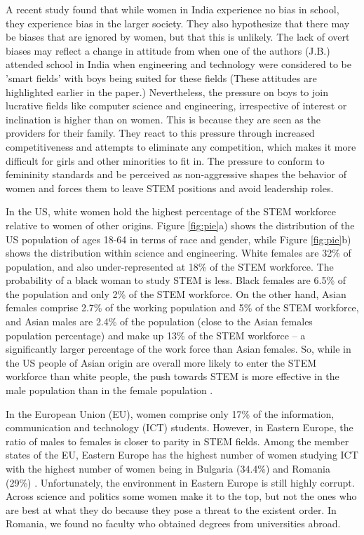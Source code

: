 \documentclass[utf8]{frontiersSCNS} %
\begin{document}
A recent study \citep{escueta2013women} found that while women in India experience no bias in school, they experience bias in the larger society. They also hypothesize that there may be biases that are ignored by women, but that this is unlikely. The lack of overt biases may reflect a change in attitude from when one of the authors (J.B.) attended school in India when engineering and technology were considered to be 'smart fields' with boys being suited for these fields (These attitudes are highlighted earlier in the paper.) Nevertheless, the pressure on boys to join lucrative fields like computer science and engineering, irrespective of interest or inclination is higher than on women. This is because they are seen as the providers for their family. They react to this pressure through increased competitiveness and attempts to eliminate any competition, which makes it more difficult for girls and other minorities to fit in. The pressure to conform to femininity standards and be perceived as non-aggressive shapes the behavior of women and forces them to leave STEM positions and avoid leadership roles.
 
 In the US, white women hold the highest percentage of the STEM workforce relative to women of other origins. Figure \ref{fig:pie}a) shows the distribution of the US population of ages 18-64 in terms of race and gender, while Figure \ref{fig:pie}b) shows the distribution within science and engineering.  White females are 32\% of population, and also under-represented at 18\% of the STEM workforce. The probability of a black woman to study STEM is less. Black females are 6.5\% of the population and only 2\% of the STEM workforce. On the other hand, Asian females comprise 2.7\% of the working population and 5\% of the STEM workforce, and Asian males are 2.4\% of the population (close to the Asian females population percentage) and make up 13\% of the STEM workforce -- a significantly larger percentage of the work force than Asian females. So, while in the US people of Asian origin are overall more likely to enter the STEM workforce than white people, the push towards STEM is more effective in the male population than in the female population \citep{guterl2014diversity}. 
 
In the European Union (EU), women comprise only 17\% of the information, communication and technology (ICT) students. However, in Eastern Europe, the ratio of males to females is closer to parity in STEM fields. Among the member states of the EU, Eastern Europe has the highest number of women studying ICT with the highest number of women being in Bulgaria (34.4\%) and Romania (29\%) \citep{EuStats}. Unfortunately, the environment in Eastern Europe is still highly corrupt.  Across science and politics some women make it to the top, but not the ones who are best at what they do because they pose a threat to the existent order. In Romania, we found no faculty who obtained degrees from universities abroad. 
\end{document}
